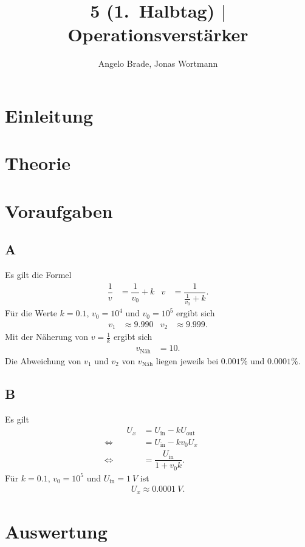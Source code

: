 \documentclass[a4paper,12pt]{article}
\numberwithin{equation}{section}
\begin{document}

\title{5 (1.\ Halbtag) $|$ Operationsverstärker}
\author{Angelo Brade, Jonas Wortmann}
\maketitle
{}


\newpage


\fancyhead[L]{\thepage}
\fancyfoot[C]{}

\tableofcontents


\newpage


\fancyhead[R]{\leftmark\\\rightmark}

\newpage
\section{Einleitung}

\newpage
\section{Theorie}

\newpage
\section{Voraufgaben}
\subsection{A}
Es gilt die Formel
\begin{align} 
        \dfrac{1}{v}&=\dfrac{1}{v_0}+k&v&=\dfrac{1}{\tfrac{1}{v_0}+k}
.\end{align} 
Für die Werte $k=0.1$, $v_0=10^4$ und $v_0=10^5$ ergibt sich
\begin{align} 
        v_1&\approx 9.990 & v_2&\approx 9.999
.\end{align} 
Mit der Näherung von $v=\tfrac{1}{k}$ ergibt sich
\begin{align} 
        v_\text{Näh}&=10
.\end{align} 
Die Abweichung von $v_1$ und $v_2$ von $v_\text{Näh}$ liegen jeweils bei $0.001\%$ und $0.0001\%$.

\subsection{B}
Es gilt
\begin{align} 
        && U_x &= U_\text{in}-kU_\text{out} && \\
        \Leftrightarrow && &= U_\text{in}-kv_0U_x &&\nonumber \\
        \Leftrightarrow && &= \dfrac{U_\text{in}}{1+v_0k}. &&
\end{align} 
Für $k=0.1$, $v_0=10^5$ und $U_\text{in}=\SI{1}{V}$ ist
\begin{align} 
        U_x\approx \SI{0.0001}{V}
.\end{align} 


\newpage
\section{Auswertung}

\clearpage
\listoffigures
\listoftables
%
%

\end{document}

